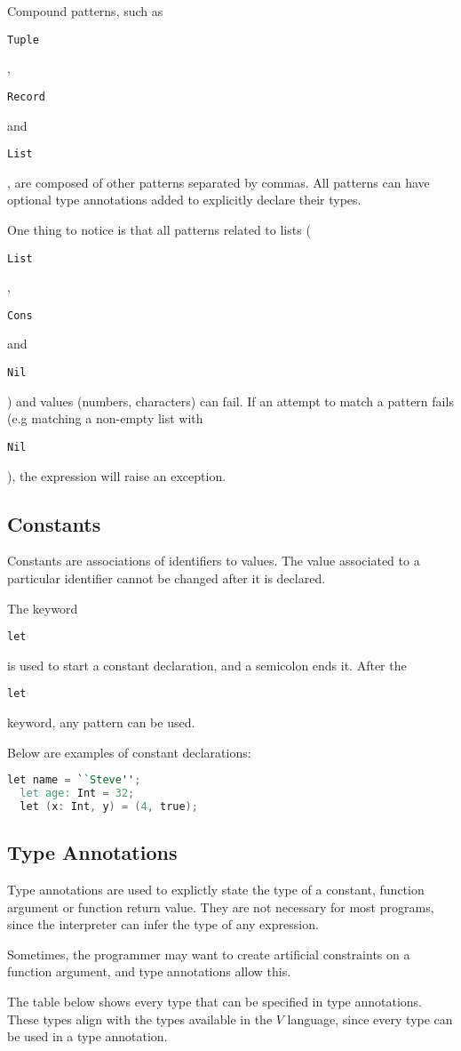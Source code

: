 \documentclass{article}
\def\code#1{\begin{footnotesize}\texttt{#1}\end{footnotesize}}
\begin{document}
\medskip

Compound patterns, such as \code{Tuple}, \code{Record} and \code{List}, are composed of other patterns separated by commas.
All patterns can have optional type annotations added to explicitly declare their types.

\smallskip

One thing to notice is that all patterns related to lists (\code{List}, \code{Cons} and \code{Nil}) and values (numbers, characters) can fail.
If an attempt to match a pattern fails (e.g matching a non-empty list with \code{Nil}), the expression will raise an exception.

\subsection{Constants}

Constants are associations of identifiers to values.
The value associated to a particular identifier cannot be changed after it is declared.

The keyword \code{let} is used to start a constant declaration, and a semicolon ends it.
After the \code{let} keyword, any pattern can be used.

Below are examples of constant declarations:

\begin{lstlisting}[language=V]
  let name = ``Steve'';
  let age: Int = 32;
  let (x: Int, y) = (4, true);
\end{lstlisting}

\subsection{Type Annotations}

Type annotations are used to explictly state the type of a constant, function argument or function return value.
They are not necessary for most programs, since the interpreter can infer the type of any expression.

Sometimes, the programmer may want to create artificial constraints on a function argument, and type annotations allow this.

The table below shows every type that can be specified in type annotations.
These types align with the types available in the $V$ language, since every type can be used in a type annotation.
\end{document}
